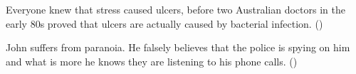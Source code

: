 \documentclass[11pt,fleqn]{article}
\newcommand{\6}{\mbox{$[\hspace*{-.6mm}[$}}
\newcommand{\9}{\mbox{$]\hspace*{-.6mm}]$}}
\begin{document}
\begin{exe}
\ex\label{fis}
\begin{xlist}

\ex Everyone knew that stress caused ulcers, before two Australian doctors in the early 80s proved that ulcers are actually caused by bacterial infection. \hfill (\citealt[501]{hazlett2010})

\ex John suffers from paranoia. He falsely believes that the police is spying on him and what is more he knows they are listening to his phone calls. \hfill (\citealt[514]{abrusan2011})



\end{xlist}

\end{exe}
\end{document}
